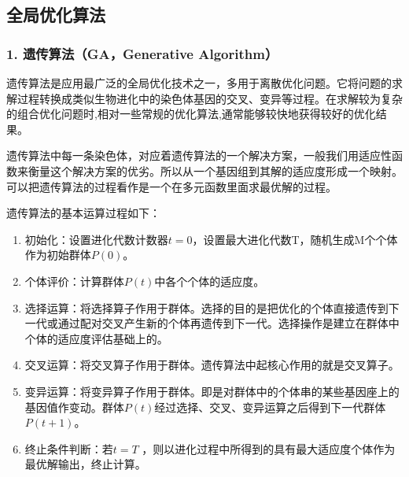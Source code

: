 \documentclass[a4paper,10pt,english]{sphinxmanual}
\begin{document}
\sphinxstepscope


\subsection{全局优化算法}
\label{\detokenize{_u7b80_u4ecb/_u6838_u5fc3_u8bbe_u8ba1_u4f18_u5316_u7b97_u6cd5/_u5168_u5c40_u641c_u7d22_u4f18_u5316_u6a21_u5757/_u5168_u5c40_u4f18_u5316_u7b97_u6cd5:id1}}\label{\detokenize{_u7b80_u4ecb/_u6838_u5fc3_u8bbe_u8ba1_u4f18_u5316_u7b97_u6cd5/_u5168_u5c40_u641c_u7d22_u4f18_u5316_u6a21_u5757/_u5168_u5c40_u4f18_u5316_u7b97_u6cd5::doc}}

\subsubsection{1. 遗传算法（GA，Generative Algorithm）}
\label{\detokenize{_u7b80_u4ecb/_u6838_u5fc3_u8bbe_u8ba1_u4f18_u5316_u7b97_u6cd5/_u5168_u5c40_u641c_u7d22_u4f18_u5316_u6a21_u5757/_u5168_u5c40_u4f18_u5316_u7b97_u6cd5:ga-generative-algorithm}}
\sphinxAtStartPar
遗传算法是应用最广泛的全局优化技术之一，多用于离散优化问题。它将问题的求解过程转换成类似生物进化中的染色体基因的交叉、变异等过程。在求解较为复杂的组合优化问题时,相对一些常规的优化算法,通常能够较快地获得较好的优化结果。

\sphinxAtStartPar
遗传算法中每一条染色体，对应着遗传算法的一个解决方案，一般我们用适应性函数来衡量这个解决方案的优劣。所以从一个基因组到其解的适应度形成一个映射。可以把遗传算法的过程看作是一个在多元函数里面求最优解的过程。

\sphinxAtStartPar


\sphinxAtStartPar
{}



\sphinxAtStartPar
遗传算法的基本运算过程如下：
\begin{enumerate}
%
\item {} 
\sphinxAtStartPar
初始化：设置进化代数计数器\(t=0\)，设置最大进化代数T，随机生成M个个体作为初始群体\(P(0)\)。

\item {} 
\sphinxAtStartPar
个体评价：计算群体\(P(t)\)中各个个体的适应度。

\item {} 
\sphinxAtStartPar
选择运算：将选择算子作用于群体。选择的目的是把优化的个体直接遗传到下一代或通过配对交叉产生新的个体再遗传到下一代。选择操作是建立在群体中个体的适应度评估基础上的。

\item {} 
\sphinxAtStartPar
交叉运算：将交叉算子作用于群体。遗传算法中起核心作用的就是交叉算子。

\item {} 
\sphinxAtStartPar
变异运算：将变异算子作用于群体。即是对群体中的个体串的某些基因座上的基因值作变动。群体\(P(t)\)经过选择、交叉、变异运算之后得到下一代群体\(P(t+1)\)。

\item {} 
\sphinxAtStartPar
终止条件判断：若\(t=T\) ，则以进化过程中所得到的具有最大适应度个体作为最优解输出，终止计算。

\end{enumerate}
\end{document}
